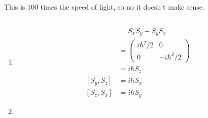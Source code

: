 \documentclass{article}
\begin{document}
This is $100$ times the speed of light, so no it doesn't make sense.

\subsection{}

\begin{enumerate}
  \item

        \begin{align*}
          [S_x, S_y] & = S_x S_y - S_y S_x              \\
                     & = \begin{pmatrix}
                           i \hbar^2 / 2 & 0              \\
                           0             & -i \hbar^2 / 2
                         \end{pmatrix} \\
                     & = i \hbar S_z                    \\
          [S_y, S_z] & = i \hbar S_x                    \\
          [S_z, S_x] & = i \hbar S_y
        \end{align*}

  \item


\end{enumerate}
\end{document}
